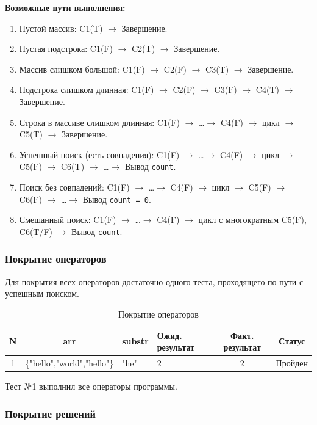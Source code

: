 \documentclass{article}[14pt]
\begin{document}
\noindent \textbf{Возможные пути выполнения:}

\begin{enumerate}
    \item Пустой массив: C1(T) $\to$ Завершение.
    \item Пустая подстрока: C1(F) $\to$ C2(T) $\to$ Завершение.
    \item Массив слишком большой: C1(F) $\to$ C2(F) $\to$ C3(T) $\to$ Завершение.
    \item Подстрока слишком длинная: C1(F) $\to$ C2(F) $\to$ C3(F) $\to$ C4(T) $\to$ Завершение.
    \item Строка в массиве слишком длинная: C1(F) $\to$ \ldots $\to$ C4(F) $\to$ цикл $\to$ C5(T) $\to$ Завершение.
    \item Успешный поиск (есть совпадения): C1(F) $\to$ \ldots $\to$ C4(F) $\to$ цикл $\to$ C5(F) $\to$ C6(T) $\to$ \ldots $\to$ Вывод \texttt{count}.
    \item Поиск без совпадений: C1(F) $\to$ \ldots $\to$ C4(F) $\to$ цикл $\to$ C5(F) $\to$ C6(F) $\to$ \ldots $\to$ Вывод \texttt{count = 0}.
    \item Смешанный поиск: C1(F) $\to$ \ldots $\to$ C4(F) $\to$ цикл с многократным C5(F), C6(T/F) $\to$ Вывод \texttt{count}.
\end{enumerate}

\subsubsection{Покрытие операторов}

Для покрытия всех операторов достаточно одного теста, проходящего по пути с успешным поиском.

\begin{table}[h!]
\centering
\caption{Покрытие операторов}
\begin{tabularx}{\textwidth}{|c|c|X|X|c|c|}
\hline
\textbf{N} & \textbf{arr} & \textbf{substr} & \textbf{Ожид. результат} & \textbf{Факт. результат} & \textbf{Статус} \\
\hline
1 & \{"hello","world","hello"\} & "he" & 2 & 2 & Пройден \\
\hline
\end{tabularx}
\end{table}

Тест №1 выполнил все операторы программы.

\subsubsection{Покрытие решений}
\end{document}
